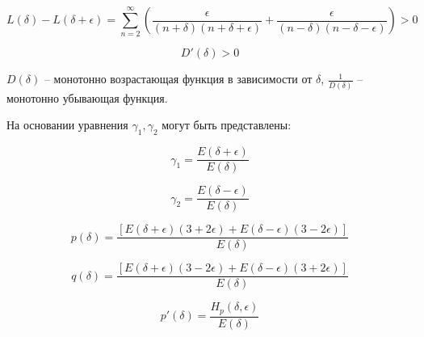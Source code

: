 \begin{equation}
\label{eq:equation77}
L(\delta) - L(\delta + \epsilon) = \sum_{n=2}^{\infty} \left(  \frac{\epsilon}{(n + \delta)(n + \delta + \epsilon)} + \frac{\epsilon}{(n - \delta)(n - \delta - \epsilon)} \right) > 0
\end{equation}

\begin{equation}
\label{eq:equation78}
D'(\delta) > 0 
\end{equation}

$D(\delta)$ -- монотонно возрастающая функция в зависимости от $\delta$, $\frac{1}{D(\delta)}$ -- монотонно убывающая функция. 

На основании уравнения  $\gamma_1, \gamma_2$ могут быть представлены:

\begin{equation}
\label{eq:equation79}
\gamma_1 = \frac{E(\delta + \epsilon)}{E(\delta)} 
\end{equation}

\begin{equation}
\label{eq:equation80}
\gamma_2 = \frac{E(\delta - \epsilon)}{E(\delta)} 
\end{equation}

\begin{equation}
\label{eq:equation81}
p(\delta) = \frac{[E(\delta + \epsilon)(3 + 2 \epsilon) + E(\delta - \epsilon)(3 - 2 \epsilon)]}{E(\delta)}
\end{equation}

\begin{equation}
\label{eq:equation82}
q(\delta) = \frac{[E(\delta + \epsilon)(3 - 2 \epsilon) + E(\delta - \epsilon)(3 + 2 \epsilon)]}{E(\delta)}
\end{equation}

\begin{equation}
\label{eq:equation83}
p'(\delta) = \frac{H_{p}(\delta, \epsilon)}{E(\delta)}
\end{equation}


